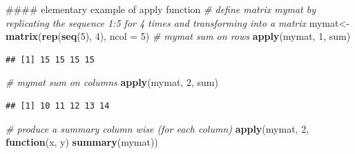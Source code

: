 \documentclass[ignorenonframetext,]{beamer}
\newenvironment{Shaded}{\begin{snugshade}}{\end{snugshade}}
\newcommand{\KeywordTok}[1]{\textcolor[rgb]{0.13,0.29,0.53}{\textbf{#1}}}
\newcommand{\DataTypeTok}[1]{\textcolor[rgb]{0.13,0.29,0.53}{#1}}
\newcommand{\DecValTok}[1]{\textcolor[rgb]{0.00,0.00,0.81}{#1}}
\newcommand{\CommentTok}[1]{\textcolor[rgb]{0.56,0.35,0.01}{\textit{#1}}}
\newcommand{\ControlFlowTok}[1]{\textcolor[rgb]{0.13,0.29,0.53}{\textbf{#1}}}
\newcommand{\NormalTok}[1]{#1}
\begin{document}
\begin{frame}[fragile]

\begin{Shaded}
\begin{Highlighting}[]
\NormalTok{#### elementary example of apply function}
\CommentTok{# define matrix mymat by replicating the sequence 1:5 for 4 times and transforming into a matrix}
\NormalTok{mymat<-}\KeywordTok{matrix}\NormalTok{(}\KeywordTok{rep}\NormalTok{(}\KeywordTok{seq}\NormalTok{(}\DecValTok{5}\NormalTok{), }\DecValTok{4}\NormalTok{), }\DataTypeTok{ncol =} \DecValTok{5}\NormalTok{)}
\CommentTok{# mymat sum on rows}
\KeywordTok{apply}\NormalTok{(mymat, }\DecValTok{1}\NormalTok{, sum)}
\end{Highlighting}
\end{Shaded}

\begin{verbatim}
## [1] 15 15 15 15
\end{verbatim}

\begin{Shaded}
\begin{Highlighting}[]
\CommentTok{# mymat sum on columns}
\KeywordTok{apply}\NormalTok{(mymat, }\DecValTok{2}\NormalTok{, sum)}
\end{Highlighting}
\end{Shaded}

\begin{verbatim}
## [1] 10 11 12 13 14
\end{verbatim}

\begin{Shaded}
\begin{Highlighting}[]
\CommentTok{# produce a summary column wise (for each column)}
\KeywordTok{apply}\NormalTok{(mymat, }\DecValTok{2}\NormalTok{, }\ControlFlowTok{function}\NormalTok{(x, y) }\KeywordTok{summary}\NormalTok{(mymat))}
\end{Highlighting}
\end{Shaded}


\end{frame}
\end{document}
